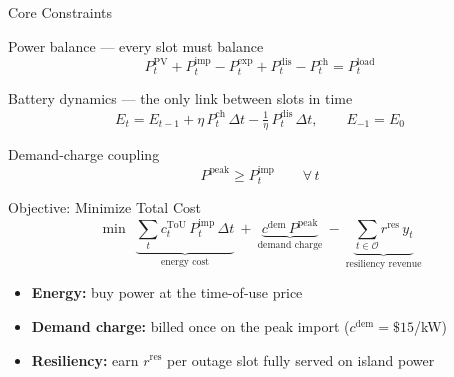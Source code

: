 \documentclass[aspectratio=169]{beamer}
\begin{document}
\begin{frame}{Core Constraints}
\begin{block}{Power balance — every slot must balance}
    \[
        P^{\text{PV}}_t + P^{\text{imp}}_t - P^{\text{exp}}_t
        + P^{\text{dis}}_t - P^{\text{ch}}_t = P^{\text{load}}_t
    \]
\end{block}

\begin{block}{Battery dynamics — the only link between slots in time}
    \[
        E_t = E_{t-1} + \eta\, P^{\text{ch}}_t\, \Delta t
        - \tfrac{1}{\eta}\, P^{\text{dis}}_t\, \Delta t,
        \qquad E_{-1} = E_0
    \]
\end{block}

\begin{block}{Demand-charge coupling}
    \[
        P^{\text{peak}} \geq P^{\text{imp}}_t \qquad \forall\, t
    \]
\end{block}
\end{frame}

\begin{frame}{Objective: Minimize Total Cost}
\[
    \min\ \
    \underbrace{\sum_{t} c^{\text{ToU}}_t\, P^{\text{imp}}_t\, \Delta t}_{\text{energy cost}}
    \ +\
    \underbrace{c^{\text{dem}}\, P^{\text{peak}}}_{\text{demand charge}}
    \ -\
    \underbrace{\sum_{t \in \mathcal{O}} r^{\text{res}}\, y_t}_{\text{resiliency revenue}}
\]

\vspace{0.3cm}
\begin{itemize}
    \item \textbf{Energy:} buy power at the time-of-use price
    \item \textbf{Demand charge:} billed once on the peak import
          ($c^{\text{dem}} = \$15$/kW)
    \item \textbf{Resiliency:} earn $r^{\text{res}}$ per outage slot fully
          served on island power
\end{itemize}
\end{frame}
\end{document}
